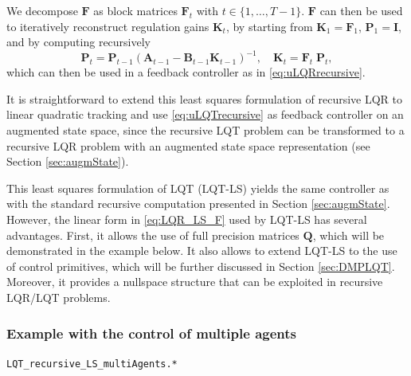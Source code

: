 \documentclass[10pt,a4paper]{article} %
\newcommand{\filename}[1]{\colorbox{rr2}{\color{white}\texttt{#1}}}
\begin{document}
We decompose $\bm{F}$ as block matrices $\bm{F}_t$ with $t\in\{1,\ldots,T-1\}$. $\bm{F}$ can then be used to iteratively reconstruct regulation gains $\bm{K}_t$, by starting from $\bm{K}_1=\bm{F}_1$, $\bm{P}_1=\bm{I}$, and by computing recursively
\begin{equation}
	\bm{P}_t = \bm{P}_{t-1} {(\bm{A}_{t-1} - \bm{B}_{t-1} \bm{K}_{t-1})}^{-1}, \quad
	\bm{K}_t = \bm{F}_t \; \bm{P}_t,
\label{eq:K_from_F}
\end{equation}
which can then be used in a feedback controller as in \eqref{eq:uLQRrecursive}. 

It is straightforward to extend this least squares formulation of recursive LQR to linear quadratic tracking and use \eqref{eq:uLQTrecursive} as feedback controller on an augmented state space, since the recursive LQT problem can be transformed to a recursive LQR problem with an augmented state space representation (see Section \ref{sec:augmState}). 

This least squares formulation of LQT (LQT-LS) yields the same controller as with the standard recursive computation presented in Section \ref{sec:augmState}. However, the linear form in \eqref{eq:LQR_LS_F} used by LQT-LS has several advantages. First, it allows the use of full precision matrices $\bm{Q}$, which will be demonstrated in the example below. It also allows to extend LQT-LS to the use of control primitives, which will be further discussed in Section \ref{sec:DMPLQT}. Moreover, it provides a nullspace structure that can be exploited in recursive LQR/LQT problems.


\subsubsection*{Example with the control of multiple agents}
\begin{flushright}
\filename{LQT\_recursive\_LS\_multiAgents.*}
\end{flushright}
\end{document}
